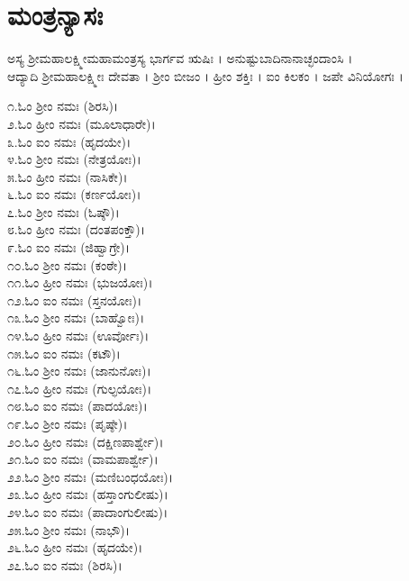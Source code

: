 \section{ಮಂತ್ರನ್ಯಾಸಃ }
ಅಸ್ಯ ಶ್ರೀಮಹಾಲಕ್ಷ್ಮೀಮಹಾಮಂತ್ರಸ್ಯ ಭಾರ್ಗವ ಋಷಿಃ । ಅನುಷ್ಟುಬಾದಿನಾನಾಚ್ಛಂದಾಂಸಿ । \\ಆದ್ಯಾದಿ ಶ್ರೀಮಹಾಲಕ್ಷ್ಮೀಃ ದೇವತಾ । ಶ್ರೀಂ ಬೀಜಂ ।  ಹ್ರೀಂ ಶಕ್ತಿಃ । ಐಂ ಕಿಲಕಂ । ಜಪೇ ವಿನಿಯೋಗಃ ।
\begin{multicols}{2}೧.ಓಂ ಶ್ರೀಂ ನಮಃ (ಶಿರಸಿ)।\\೨.ಓಂ ಹ್ರೀಂ ನಮಃ (ಮೂಲಾಧಾರೇ)।\\೩.ಓಂ ಐಂ ನಮಃ (ಹೃದಯೇ)।\\೪.ಓಂ ಶ್ರೀಂ ನಮಃ (ನೇತ್ರಯೋಃ)।\\೫.ಓಂ ಹ್ರೀಂ ನಮಃ (ನಾಸಿಕೇ)।\\೬.ಓಂ ಐಂ ನಮಃ (ಕರ್ಣಯೋಃ)।\\೭.ಓಂ ಶ್ರೀಂ ನಮಃ (ಓಷ್ಠೌ)।\\೮.ಓಂ ಹ್ರೀಂ ನಮಃ (ದಂತಪಂಕ್ತೌ)।\\೯.ಓಂ ಐಂ ನಮಃ (ಜಿಹ್ವಾಗ್ರೇ)।\\೧೦.ಓಂ ಶ್ರೀಂ ನಮಃ (ಕಂಠೇ)।\\೧೧.ಓಂ ಹ್ರೀಂ ನಮಃ (ಭುಜಯೋಃ)।\\೧೨.ಓಂ ಐಂ ನಮಃ (ಸ್ತನಯೋಃ)।\\೧೩.ಓಂ ಶ್ರೀಂ ನಮಃ (ಬಾಹ್ವೋಃ)।\\೧೪.ಓಂ ಹ್ರೀಂ ನಮಃ (ಊರ್ವೋಃ)।\\೧೫.ಓಂ ಐಂ ನಮಃ (ಕಟೌ)।\\೧೬.ಓಂ ಶ್ರೀಂ ನಮಃ (ಜಾನುನೋಃ)।\\೧೭.ಓಂ ಹ್ರೀಂ ನಮಃ (ಗುಲ್ಫಯೋಃ)।\\೧೮.ಓಂ ಐಂ ನಮಃ (ಪಾದಯೋಃ)।\\೧೯.ಓಂ ಶ್ರೀಂ ನಮಃ (ಪೃಷ್ಠೇ)।\\೨೦.ಓಂ ಹ್ರೀಂ ನಮಃ (ದಕ್ಷಿಣಪಾರ್ಶ್ವೇ)।\\೨೧.ಓಂ ಐಂ ನಮಃ (ವಾಮಪಾರ್ಶ್ವೇ)।\\೨೨.ಓಂ ಶ್ರೀಂ ನಮಃ (ಮಣಿಬಂಧಯೋಃ)।\\೨೩.ಓಂ ಹ್ರೀಂ ನಮಃ (ಹಸ್ತಾಂಗುಲೀಷು)।\\೨೪.ಓಂ ಐಂ ನಮಃ (ಪಾದಾಂಗುಲೀಷು)।\\೨೫.ಓಂ ಶ್ರೀಂ ನಮಃ (ನಾಭೌ)।\\೨೬.ಓಂ ಹ್ರೀಂ ನಮಃ (ಹೃದಯೇ)।\\೨೭.ಓಂ ಐಂ ನಮಃ (ಶಿರಸಿ)।\end{multicols}
